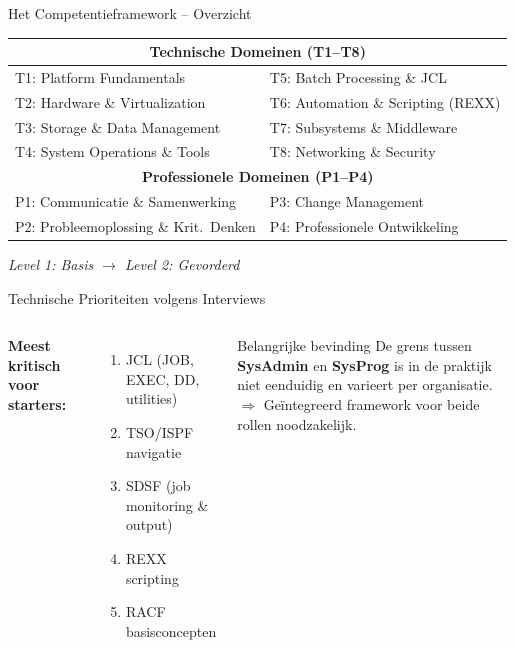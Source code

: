 \documentclass[aspectratio=169]{beamer}
\begin{document}
\begin{frame}{Het Competentieframework – Overzicht}
  \begin{center}
  \begin{tabular}{ll}
    \toprule
    \multicolumn{2}{c}{\textbf{Technische Domeinen (T1--T8)}} \\
    \midrule
    T1: Platform Fundamentals       & T5: Batch Processing \& JCL \\
    T2: Hardware \& Virtualization  & T6: Automation \& Scripting (REXX) \\
    T3: Storage \& Data Management  & T7: Subsystems \& Middleware \\
    T4: System Operations \& Tools  & T8: Networking \& Security \\
    \midrule
    \multicolumn{2}{c}{\textbf{Professionele Domeinen (P1--P4)}} \\
    \midrule
    P1: Communicatie \& Samenwerking         & P3: Change Management \\
    P2: Probleemoplossing \& Krit.\ Denken   & P4: Professionele Ontwikkeling \\
    \bottomrule
  \end{tabular}
  \end{center}
  \vspace{0.4em}
  \centering\textit{Level 1: Basis \quad $\longrightarrow$ \quad Level 2: Gevorderd}
\end{frame}

\begin{frame}{Technische Prioriteiten volgens Interviews}
  \begin{columns}
      \textbf{Meest kritisch voor starters:}
      \begin{enumerate}
        \item JCL (JOB, EXEC, DD, utilities)
        \item TSO/ISPF navigatie
        \item SDSF (job monitoring \& output)
        \item REXX scripting
        \item RACF basisconcepten
      \end{enumerate}
      \begin{alertblock}{Belangrijke bevinding}
        De grens tussen \textbf{SysAdmin} en \textbf{SysProg} is in de praktijk niet eenduidig en varieert per organisatie. \\[0.5em]
        $\Rightarrow$ Geïntegreerd framework voor beide rollen noodzakelijk.
      \end{alertblock}
  \end{columns}
\end{frame}
\end{document}
